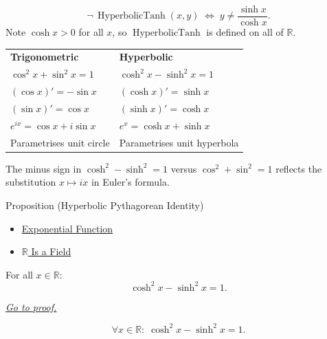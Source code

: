 \begin{remark*}
\[
  \neg\,\operatorname{HyperbolicTanh}(x,y)
  \;\iff\;
  y \neq \frac{\sinh x}{\cosh x}.
\]
Note $\cosh x > 0$ for all $x$, so $\operatorname{HyperbolicTanh}$
is defined on all of $\mathbb{R}$.
\end{remark*}

\begin{remark*}
\begin{center}
\begin{tabular}{@{}ll@{}}
\textbf{Trigonometric} & \textbf{Hyperbolic} \\
$\cos^2 x + \sin^2 x = 1$ & $\cosh^2 x - \sinh^2 x = 1$ \\
$(\cos x)' = -\sin x$ & $(\cosh x)' = \sinh x$ \\
$(\sin x)' = \cos x$ & $(\sinh x)' = \cosh x$ \\
$e^{ix} = \cos x + i\sin x$ & $e^x = \cosh x + \sinh x$ \\
Parametrises unit circle & Parametrises unit hyperbola \\
\end{tabular}
\end{center}
The minus sign in $\cosh^2 - \sinh^2 = 1$ versus $\cos^2 + \sin^2 =
1$ reflects the substitution $x \mapsto ix$ in Euler's formula.
\end{remark*}


\begin{propositionbox}{Proposition (Hyperbolic Pythagorean Identity)}

\begin{dependencies}
\begin{itemize}
  \item \hyperref[def:exponential]{Exponential Function}
  \item \hyperref[thm:r-is-a-field]{$\mathbb{R}$ Is a Field}
\end{itemize}
\end{dependencies}
\begin{proposition}
\label{prop:hyperbolic-pythagorean}
For all $x \in \mathbb{R}$:
\[
  \cosh^2 x - \sinh^2 x = 1.
\]

\smallskip\noindent
\hyperref[prf:hyperbolic-pythagorean]{\textit{Go to proof.}}
\end{proposition}
\end{propositionbox}\begin{remark*}
\[
  \forall x \in \mathbb{R} :\; \cosh^2 x - \sinh^2 x = 1.
\]
\end{remark*}

